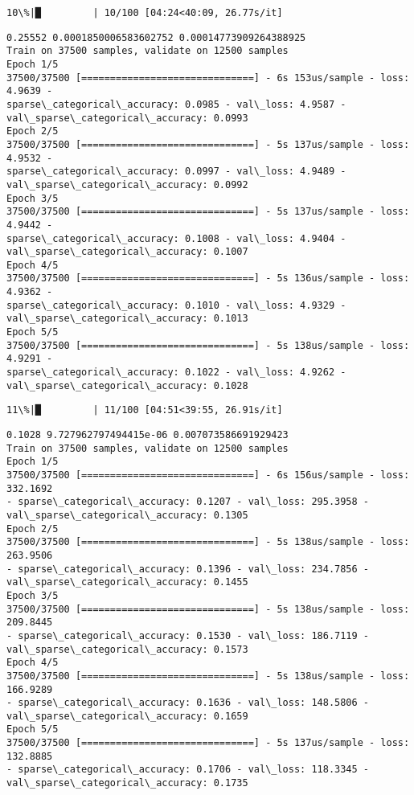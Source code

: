 \documentclass[11pt]{article}
\begin{document}
    \begin{Verbatim}[commandchars=\\\{\}]
 10\%|█         | 10/100 [04:24<40:09, 26.77s/it]
    \end{Verbatim}

    \begin{Verbatim}[commandchars=\\\{\}]
0.25552 0.0001850006583602752 0.00014773909264388925
Train on 37500 samples, validate on 12500 samples
Epoch 1/5
37500/37500 [==============================] - 6s 153us/sample - loss: 4.9639 -
sparse\_categorical\_accuracy: 0.0985 - val\_loss: 4.9587 -
val\_sparse\_categorical\_accuracy: 0.0993
Epoch 2/5
37500/37500 [==============================] - 5s 137us/sample - loss: 4.9532 -
sparse\_categorical\_accuracy: 0.0997 - val\_loss: 4.9489 -
val\_sparse\_categorical\_accuracy: 0.0992
Epoch 3/5
37500/37500 [==============================] - 5s 137us/sample - loss: 4.9442 -
sparse\_categorical\_accuracy: 0.1008 - val\_loss: 4.9404 -
val\_sparse\_categorical\_accuracy: 0.1007
Epoch 4/5
37500/37500 [==============================] - 5s 136us/sample - loss: 4.9362 -
sparse\_categorical\_accuracy: 0.1010 - val\_loss: 4.9329 -
val\_sparse\_categorical\_accuracy: 0.1013
Epoch 5/5
37500/37500 [==============================] - 5s 138us/sample - loss: 4.9291 -
sparse\_categorical\_accuracy: 0.1022 - val\_loss: 4.9262 -
val\_sparse\_categorical\_accuracy: 0.1028
    \end{Verbatim}

    \begin{Verbatim}[commandchars=\\\{\}]
 11\%|█         | 11/100 [04:51<39:55, 26.91s/it]
    \end{Verbatim}

    \begin{Verbatim}[commandchars=\\\{\}]
0.1028 9.727962797494415e-06 0.007073586691929423
Train on 37500 samples, validate on 12500 samples
Epoch 1/5
37500/37500 [==============================] - 6s 156us/sample - loss: 332.1692
- sparse\_categorical\_accuracy: 0.1207 - val\_loss: 295.3958 -
val\_sparse\_categorical\_accuracy: 0.1305
Epoch 2/5
37500/37500 [==============================] - 5s 138us/sample - loss: 263.9506
- sparse\_categorical\_accuracy: 0.1396 - val\_loss: 234.7856 -
val\_sparse\_categorical\_accuracy: 0.1455
Epoch 3/5
37500/37500 [==============================] - 5s 138us/sample - loss: 209.8445
- sparse\_categorical\_accuracy: 0.1530 - val\_loss: 186.7119 -
val\_sparse\_categorical\_accuracy: 0.1573
Epoch 4/5
37500/37500 [==============================] - 5s 138us/sample - loss: 166.9289
- sparse\_categorical\_accuracy: 0.1636 - val\_loss: 148.5806 -
val\_sparse\_categorical\_accuracy: 0.1659
Epoch 5/5
37500/37500 [==============================] - 5s 137us/sample - loss: 132.8885
- sparse\_categorical\_accuracy: 0.1706 - val\_loss: 118.3345 -
val\_sparse\_categorical\_accuracy: 0.1735
    \end{Verbatim}
\end{document}
